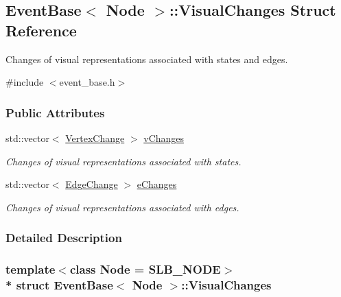 \hypertarget{structEventBase_1_1VisualChanges}{}\subsection{Event\+Base$<$ Node $>$\+:\+:Visual\+Changes Struct Reference}
\label{structEventBase_1_1VisualChanges}


Changes of visual representations associated with states and edges.  




{\ttfamily \#include $<$event\+\_\+base.\+h$>$}

\subsubsection*{Public Attributes}
\begin{DoxyCompactItemize}
\item 
std\+::vector$<$ \hyperlink{structEventBase_1_1VertexChange}{Vertex\+Change} $>$ \hyperlink{structEventBase_1_1VisualChanges_a736b92fb69e4cbef4a61ea767fea5222}{v\+Changes}\hypertarget{structEventBase_1_1VisualChanges_a736b92fb69e4cbef4a61ea767fea5222}{}\label{structEventBase_1_1VisualChanges_a736b92fb69e4cbef4a61ea767fea5222}

\begin{DoxyCompactList}\small\item\em Changes of visual representations associated with states. \end{DoxyCompactList}\item 
std\+::vector$<$ \hyperlink{structEventBase_1_1EdgeChange}{Edge\+Change} $>$ \hyperlink{structEventBase_1_1VisualChanges_a85d2e53245e371acd53aeeb336c4c10c}{e\+Changes}\hypertarget{structEventBase_1_1VisualChanges_a85d2e53245e371acd53aeeb336c4c10c}{}\label{structEventBase_1_1VisualChanges_a85d2e53245e371acd53aeeb336c4c10c}

\begin{DoxyCompactList}\small\item\em Changes of visual representations associated with edges. \end{DoxyCompactList}\end{DoxyCompactItemize}


\subsubsection{Detailed Description}
\subsubsection*{template$<$class Node = S\+L\+B\+\_\+\+N\+O\+DE$>$\\*
struct Event\+Base$<$ Node $>$\+::\+Visual\+Changes}

